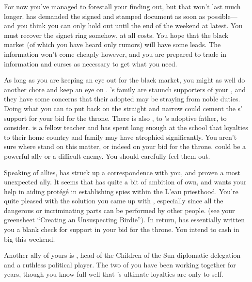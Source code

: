 \documentclass[char]{GL2020}
\begin{document}
For now you've managed to forestall your \cQueen{\parent} finding out, but that won't last much longer. \cQueen{\They} has demanded the signed and stamped document as soon as possible---and you think you can only hold out until the end of the weekend at latest. You must recover the signet ring somehow, at all costs. You hope that the black market (of which you have heard only rumors) will have some leads. The information won't come cheaply however, and you are prepared to trade in information and curses as necessary to get what you need.

As long as you are keeping an eye out for the black market, you might as well do another chore and keep an eye on \cAdopted{\full}. \cAdopted{}'s family are staunch supporters of your \cQueen{\parent}, and they have some concerns that their adopted \cAdopted{\child} may be straying from \cAdopted{\their} noble duties. Doing what you can to put \cAdopted{\them} back on the straight and narrow could cement the \cAdopted{\formal}s' support for your bid for the throne. There is also \cMusic{\full}, \cMusic{\auncle} to \cAdopted{}'s adoptive father, to consider. \cMusic{} is a fellow teacher and has spent long enough at the school that \cMusic{\their} loyalties to their home country and family may have atrophied significantly. You aren't sure where \cMusic{\they} stand on this matter, or indeed on your bid for the throne. \cMusic{\They} could be a powerful ally or a difficult enemy. You should carefully feel them out.

Speaking of allies, \cAntiChup{\full} has struck up a correspondence with you, and proven a most unexpected ally. It seems that \cAntiChup{} has quite a bit of ambition of \cAntiChup{\their} own, and wants your help in aiding \cAntiChup{\their} protégé in establishing spies within the L'eau priesthood. You're quite pleased with the solution you came up with , especially since all the dangerous or incriminating parts can be performed by other people. (see your greensheet “Creating an Unsuspecting Birdie”).  In return, \cAntiChup{} has essentially written you a blank check for support in your bid for the \pFarm{} throne. You intend to cash in big this weekend.

Another ally of yours is \cEvil{\full}, head of the Children of the Sun diplomatic delegation and a ruthless political player. The two of you have been working together for years, though you know full well that \cEvil{}'s ultimate loyalties are only to \cEvil{\them}self.
\end{document}
